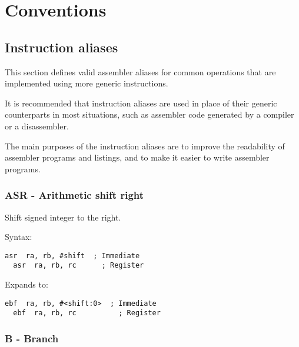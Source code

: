%

\chapter{Conventions}

\section{Instruction aliases}

This section defines valid assembler aliases for common operations that are
implemented using more generic instructions.

It is recommended that instruction aliases are used in place of their generic
counterparts in most situations, such as assembler code generated by a compiler
or a disassembler.

The main purposes of the instruction aliases are to improve the readability of
assembler programs and listings, and to make it easier to write assembler
programs.

\subsection{ASR - Arithmetic shift right}
\label{insn:ASR}

Shift signed integer to the right.

Syntax:
\begin{lstlisting}[style=assembler]
  asr  ra, rb, #shift  ; Immediate
  asr  ra, rb, rc      ; Register
\end{lstlisting}

Expands to:
\begin{lstlisting}[style=assembler]
  ebf  ra, rb, #<shift:0>  ; Immediate
  ebf  ra, rb, rc          ; Register
\end{lstlisting}

\subsection{B - Branch}
\label{insn:B}

